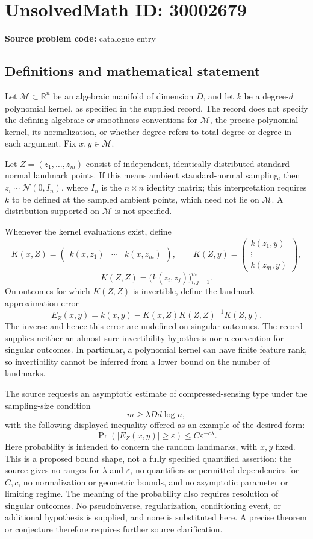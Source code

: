 \documentclass[11pt]{article}
\newcommand{\R}{\mathbb{R}}
\begin{document}
\section*{UnsolvedMath ID: 30002679}
\textbf{Source problem code:} catalogue entry
\subsection{Definitions and mathematical statement}
Let \(\mathcal M\subset\R^n\) be an algebraic manifold of dimension \(D\), and let \(k\) be a degree-\(d\) polynomial kernel, as specified in the supplied record. The record does not specify the defining algebraic or smoothness conventions for \(\mathcal M\), the precise polynomial kernel, its normalization, or whether degree refers to total degree or degree in each argument. Fix \(x,y\in\mathcal M\).

Let \(Z=(z_1,\ldots,z_m)\) consist of independent, identically distributed standard-normal landmark points. If this means ambient standard-normal sampling, then \(z_i\sim\mathcal N(0,I_n)\), where \(I_n\) is the \(n\times n\) identity matrix; this interpretation requires \(k\) to be defined at the sampled ambient points, which need not lie on \(\mathcal M\). A distribution supported on \(\mathcal M\) is not specified.

Whenever the kernel evaluations exist, define
\[
K(x,Z)=\begin{pmatrix}k(x,z_1)&\cdots&k(x,z_m)\end{pmatrix},\qquad
K(Z,y)=\begin{pmatrix}k(z_1,y)\\\vdots\\k(z_m,y)\end{pmatrix},
\]
\[
K(Z,Z)=\bigl(k(z_i,z_j)\bigr)_{i,j=1}^{m}.
\]
On outcomes for which \(K(Z,Z)\) is invertible, define the landmark approximation error
\[
E_Z(x,y)=k(x,y)-K(x,Z)K(Z,Z)^{-1}K(Z,y).
\]
The inverse and hence this error are undefined on singular outcomes. The record supplies neither an almost-sure invertibility hypothesis nor a convention for singular outcomes. In particular, a polynomial kernel can have finite feature rank, so invertibility cannot be inferred from a lower bound on the number of landmarks.

The source requests an asymptotic estimate of compressed-sensing type under the sampling-size condition
\[
m\geq\lambda Dd\log n,
\]
with the following displayed inequality offered as an example of the desired form:
\[
\Pr\!\left(\lvert E_Z(x,y)\rvert\geq\varepsilon\right)
\leq C\varepsilon^{-c\lambda}.
\]
Here probability is intended to concern the random landmarks, with \(x,y\) fixed. This is a proposed bound shape, not a fully specified quantified assertion: the source gives no ranges for \(\lambda\) and \(\varepsilon\), no quantifiers or permitted dependencies for \(C,c\), no normalization or geometric bounds, and no asymptotic parameter or limiting regime. The meaning of the probability also requires resolution of singular outcomes. No pseudoinverse, regularization, conditioning event, or additional hypothesis is supplied, and none is substituted here. A precise theorem or conjecture therefore requires further source clarification.
\end{document}
